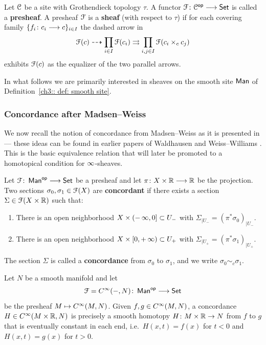 \begin{definition}\label{ch3:: def: sheaf}
    Let $\mathcal C$ be a site with Grothendieck topology $\tau$. A functor
    $\mathcal F\colon \mathcal C^{\mathsf{op}} \longrightarrow \operatorname{{\mathsf{Set}}}$ is called a \textbf{presheaf}. A
    presheaf $\mathcal F$ is a \textbf{sheaf} (with respect to $\tau$) if for each
    covering family $\{f_i\colon c_i \longrightarrow c\}_{i\in I}$ the dashed arrow in
    \[
      \mathcal F(c) \dashrightarrow \prod_{i\in I}\mathcal F(c_i)
      \rightrightarrows \prod_{i,j\in I}\mathcal F(c_i\times_c c_j)
    \]
    exhibits $\mathcal F(c)$ as the equalizer of the two parallel arrows.
\end{definition}

In what follows we are primarily interested in sheaves on the smooth site $\operatorname{\sf Man}$ of Definition~\ref{ch3:: def: smooth site}.
\bigskip

\subsubsection{Concordance after Madsen--Weiss}

We now recall the notion of concordance from Madsen--Weiss as it is presented in \cite{MW07} --- these ideas can be found in earlier papers of Waldhausen \cite{Wa} and Weiss--Williams \cite{MW95}. This is the basic equivalence relation that will later be promoted to a homotopical condition for $\operatorname{\infty}$-sheaves.

\begin{definition}[Concordance]\label{ch3:: def: concordance}
  {\cite[Definition~2.1.3]{MW07}}
  Let $\mathcal F\colon \operatorname{\sf Man}^{\mathsf{op}} \longrightarrow \operatorname{{\mathsf{Set}}}$ be a presheaf and let
  $\pi \colon X \times \mathbb R \longrightarrow \mathbb R$ be the projection. Two sections
  $\sigma_0,\sigma_1 \in \mathcal F(X)$ are \textbf{concordant} if there exists a
  section $\Sigma \in \mathcal F(X\times\mathbb R)$ such that:
  \begin{enumerate}
    \item There is an open neighborhood
    $X \times (-\operatorname{\infty},0] \subset U_{-}$ with
    $\Sigma_{|U_{-}} = (\pi^* \sigma_{0})_{|U_{-}}$.
    \item There is an open neighborhood
    $X \times [0,+\operatorname{\infty}) \subset U_{+}$ with
    $\Sigma_{|U_{+}} = (\pi^* \sigma_{1})_{|U_{+}}$.
  \end{enumerate}
  The section $\Sigma$ is called a \textbf{concordance} from $\sigma_0$ to
  $\sigma_1$, and we write $\sigma_0 \sim_c \sigma_1$.
\end{definition}

\begin{example}
  Let $N$ be a smooth manifold and let
  \[
    \mathcal F = C^{\operatorname{\infty}}(-,N)\colon \operatorname{\sf Man}^{\mathsf{op}} \longrightarrow \operatorname{{\mathsf{Set}}}
  \]
  be the presheaf $M \mapsto C^{\operatorname{\infty}}(M,N)$. Given $f,g\in C^{\operatorname{\infty}}(M,N)$, a
  concordance $H\in C^{\operatorname{\infty}}(M\times\mathbb R,N)$ is precisely a smooth homotopy
  $H\colon M\times\mathbb R\to N$ from $f$ to $g$ that is eventually constant in
  each end, i.e.\ $H(x,t)=f(x)$ for $t<0$ and $H(x,t)=g(x)$ for $t>0$.
\end{example}

